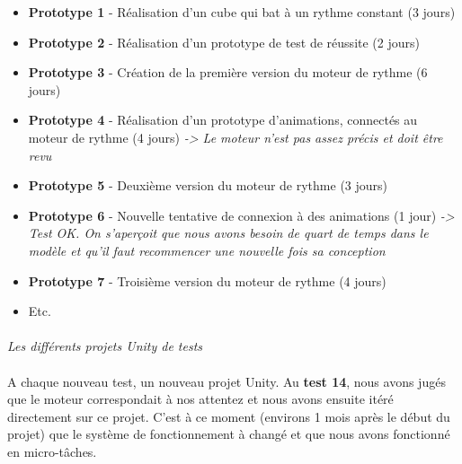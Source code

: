 \begin{itemize}
\item \textbf{Prototype 1} - Réalisation d’un cube qui bat à un rythme constant (3 jours)
\item \textbf{Prototype 2} - Réalisation d’un prototype de test de réussite (2 jours)
\item \textbf{Prototype 3} - Création de la première version du moteur de rythme (6 jours)
\item \textbf{Prototype 4} - Réalisation d’un prototype d’animations, connectés au moteur de rythme (4 jours) \emph{-> Le moteur n’est pas assez précis et doit être revu}
\item \textbf{Prototype 5} - Deuxième version du moteur de rythme (3 jours)
\item \textbf{Prototype 6} - Nouvelle tentative de connexion à des animations (1 jour) \emph{-> Test OK. On s’aperçoit que nous avons besoin de quart de temps dans le modèle et qu’il faut recommencer une nouvelle fois sa conception}
\item \textbf{Prototype 7} - Troisième version du moteur de rythme (4 jours)
\item Etc.
\end{itemize}

\paragraph{}
\noindent
{}
\begin{center}
\textit{Les différents projets Unity de tests
}
\end{center}

\paragraph{}
A chaque nouveau test, un nouveau projet Unity. Au \textbf{test 14}, nous avons jugés que le moteur correspondait à nos attentez et nous avons ensuite itéré directement sur ce projet. C’est à ce moment (environs 1 mois après le début du projet) que le système de fonctionnement à changé et que nous avons fonctionné en micro-tâches.

